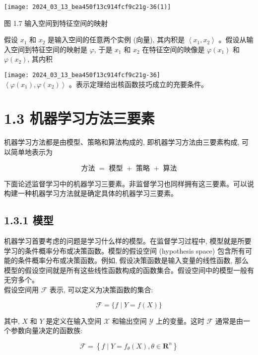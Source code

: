 \documentclass[10pt]{article}
\begin{document}
\begin{CJK*}{UTF8}{bsmi}
\begin{center}
\texttt{[image: 2024\_03\_13\_bea450f13c914fcf9c21g-36(1)]}
\end{center}

图 1.7 输入空间到特征空间的映射

假设 $x_{1}$ 和 $x_{2}$ 是输入空间的任意两个实例 (向量), 其内积是 $\left\langle x_{1}, x_{2}\right\rangle$ 。假设从输入空间到特征空间的映射是 $\varphi$, 于是 $x_{1}$ 和 $x_{2}$ 在特征空间的映像是 $\varphi\left(x_{1}\right)$ 和 $\varphi\left(x_{2}\right)$, 其内积

\texttt{[image: 2024\_03\_13\_bea450f13c914fcf9c21g-36]}\\
$\left\langle\varphi\left(x_{1}\right), \varphi\left(x_{2}\right)\right\rangle$ 。表示定理给出核函数技巧成立的充要条件。

\section*{1.3 机器学习方法三要素}
机器学习方法都是由模型、策略和算法构成的, 即机器学习方法由三要素构成, 可以简单地表示为

$$
\text { 方法 }=\text { 模型 }+ \text { 策略 }+ \text { 算法 }
$$

下面论述监督学习中的机器学习三要素。非监督学习也同样拥有这三要素。可以说构建一种机器学习方法就是确定具体的机器学习三要素。

\subsection*{1.3.1 模型}
机器学习首要考虑的问题是学习什么样的模型。在监督学习过程中, 模型就是所要学习的条件概率分布或决策函数。模型的假设空间 (hypothesis space) 包含所有可能的条件概率分布或决策函数。例如, 假设决策函数是输入变量的线性函数, 那么模型的假设空间就是所有这些线性函数构成的函数集合。假设空间中的模型一般有无穷多个。\\
假设空间用 $\mathcal{F}$ 表示, 可以定义为决策函数的集合:


\begin{equation*}
\mathcal{F}=\{f \mid Y=f(X)\} \tag{1.5}
\end{equation*}


其中, $X$ 和 $Y$ 是定义在输入空间 $\mathcal{X}$ 和输出空间 $\mathcal{Y}$ 上的变量。这时 $\mathcal{F}$ 通常是由一个参数向量决定的函数族:


\begin{equation*}
\mathcal{F}=\left\{f \mid Y=f_{\theta}(X), \theta \in \boldsymbol{R}^{n}\right\} \tag{1.6}
\end{equation*}



\end{CJK*}
\end{document}
